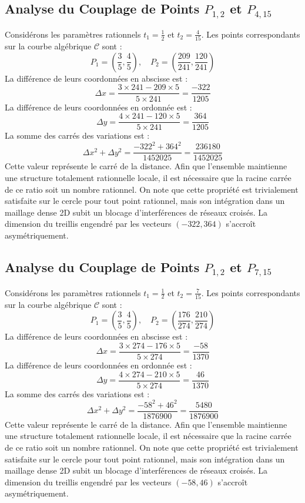 \documentclass[12pt, a4paper]{article}
\begin{document}
\subsection{Analyse du Couplage de Points $P_{1,2}$ et $P_{4,15}$}
Considérons les paramètres rationnels $t_1 = \frac{1}{2}$ et $t_2 = \frac{4}{15}$.
Les points correspondants sur la courbe algébrique $\mathcal{C}$ sont :
$$ P_1 = \left( \frac{3}{5}, \frac{4}{5} \right), \quad P_2 = \left( \frac{209}{241}, \frac{120}{241} \right) $$
La différence de leurs coordonnées en abscisse est :
$$ \Delta x = \frac{3 \times 241 - 209 \times 5}{5 \times 241} = \frac{-322}{1205} $$
La différence de leurs coordonnées en ordonnée est :
$$ \Delta y = \frac{4 \times 241 - 120 \times 5}{5 \times 241} = \frac{364}{1205} $$
La somme des carrés des variations est :
$$ \Delta x^2 + \Delta y^2 = \frac{ -322^2 + 364^2 }{ 1452025 } = \frac{ 236180 }{ 1452025 } $$
Cette valeur représente le carré de la distance. Afin que l'ensemble maintienne une structure totalement rationnelle locale, il est nécessaire que la racine carrée de ce ratio soit un nombre rationnel. On note que cette propriété est trivialement satisfaite sur le cercle pour tout point rationnel, mais son intégration dans un maillage dense 2D subit un blocage d'interférences de réseaux croisés. La dimension du treillis engendré par les vecteurs $( -322, 364 )$ s'accroît asymétriquement.


\subsection{Analyse du Couplage de Points $P_{1,2}$ et $P_{7,15}$}
Considérons les paramètres rationnels $t_1 = \frac{1}{2}$ et $t_2 = \frac{7}{15}$.
Les points correspondants sur la courbe algébrique $\mathcal{C}$ sont :
$$ P_1 = \left( \frac{3}{5}, \frac{4}{5} \right), \quad P_2 = \left( \frac{176}{274}, \frac{210}{274} \right) $$
La différence de leurs coordonnées en abscisse est :
$$ \Delta x = \frac{3 \times 274 - 176 \times 5}{5 \times 274} = \frac{-58}{1370} $$
La différence de leurs coordonnées en ordonnée est :
$$ \Delta y = \frac{4 \times 274 - 210 \times 5}{5 \times 274} = \frac{46}{1370} $$
La somme des carrés des variations est :
$$ \Delta x^2 + \Delta y^2 = \frac{ -58^2 + 46^2 }{ 1876900 } = \frac{ 5480 }{ 1876900 } $$
Cette valeur représente le carré de la distance. Afin que l'ensemble maintienne une structure totalement rationnelle locale, il est nécessaire que la racine carrée de ce ratio soit un nombre rationnel. On note que cette propriété est trivialement satisfaite sur le cercle pour tout point rationnel, mais son intégration dans un maillage dense 2D subit un blocage d'interférences de réseaux croisés. La dimension du treillis engendré par les vecteurs $( -58, 46 )$ s'accroît asymétriquement.
\end{document}
